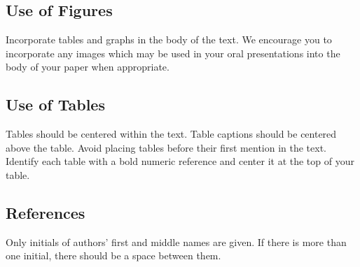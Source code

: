 \documentclass[letterpaper,times]{IONconf}
\begin{document}
\subsection{Use of Figures}

Incorporate tables and graphs in the body of the text. We encourage you to incorporate any images which may be used in your oral presentations into the body of your paper when appropriate.


\subsection{Use of Tables}

Tables should be centered within the text. Table captions should be centered above the table. Avoid placing tables before their first mention in the text. Identify each table with a bold numeric reference and center it at the top of your table.



\subsection{References}

Only initials of authors' first and middle names are given. If there is more than one initial, there should be a space between them.
\end{document}
